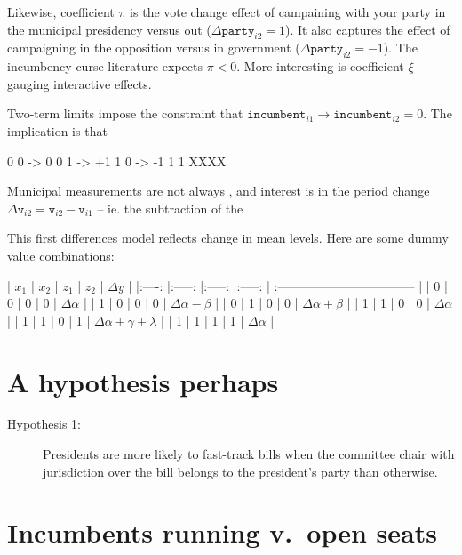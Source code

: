 \documentclass[letter,12pt]{article}
\newcommand{\vn}[1]{\vnform{#1}}      %
\newcommand{\vnform}[1]{\mathtt{#1}}  %
\begin{document}
Likewise, coefficient $\pi$ is the vote change effect of campaining with your party in the municipal presidency versus out ($\Delta \vn{party}_{i2}=1$). It also captures the effect of campaigning in the opposition versus in government ($\Delta \vn{party}_{i2}=-1$). The incumbency curse literature \citep{lucardi.rosas.Incumbency.2016,folkle.snyderGubMidtermSlump.2012} expects $\pi < 0$. More interesting is coefficient $\xi$ gauging interactive effects.  


Two-term limits impose the constraint that $\vn{incumbent}_{i1} \rightarrow \vn{incumbent}_{i2}=0$. The implication is that 

0 0 ->  0
0 1 -> +1
1 0 -> -1
1 1 XXXX

Municipal measurements are not always , and interest is in the period change $\Delta \vn{v}_{i2} = \vn{v}_{i2} - \vn{v}_{i1}$ -- ie. the subtraction of the 


                                   This first differences model reflects change in mean levels. Here are some dummy value combinations:

| $x_1$ |  $x_2$ |  $z_1$ |  $z_2$ | $\Delta y$                         |
|:----: |:-----: |:-----: |:-----: | :--------------------------------- |
|     0 |      0 |      0 |      0 | $\Delta \alpha$                    |
|     1 |      0 |      0 |      0 | $\Delta \alpha  - \beta$           |
|     0 |      1 |      0 |      0 | $\Delta \alpha  + \beta$           |
|     1 |      1 |      0 |      0 | $\Delta \alpha$                    |
|     1 |      1 |      0 |      1 | $\Delta \alpha + \gamma + \lambda$ |
|     1 |      1 |      1 |      1 | $\Delta \alpha$                    |


\section{A hypothesis perhaps}

\begin{description}
  \item [Hypothesis 1:] Presidents are more likely to fast-track bills when the committee chair with jurisdiction over the bill  belongs to the president's party than otherwise.
\end{description}

\section{Incumbents running v.\ open seats}
\end{document}
